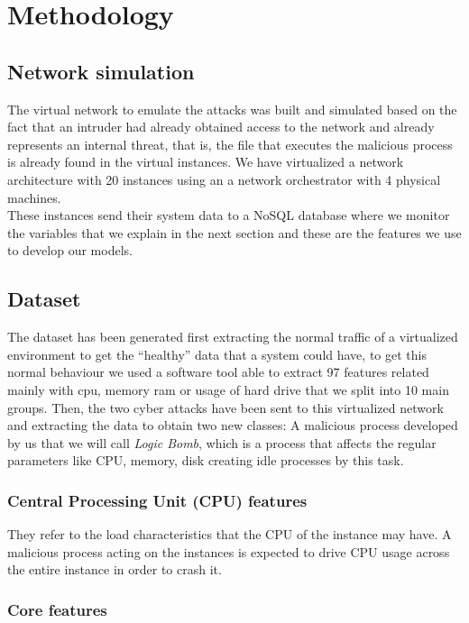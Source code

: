 \documentclass{iosart2c}
\begin{document}
\section{Methodology}

\subsection{Network simulation}

The virtual network to emulate the attacks was built and simulated based on the fact that an intruder had already obtained access to the network and already represents an internal threat, that is, the file that executes the malicious process is already found in the virtual instances. We have virtualized a network architecture with 20 instances using an a network orchestrator with 4 physical machines.\\

These instances send their system data to a NoSQL database where we monitor the variables that we explain in the next section and these are the features we use to develop our models.

\subsection{Dataset}\label{dataset_autoencoder}

The dataset has been generated first extracting the normal traffic of a virtualized environment to get the ``healthy'' data that a system could have, to get this normal behaviour we used a software tool able to extract 97 features related mainly with cpu, memory ram or usage of hard drive that we split into 10 main groups. Then, the two cyber attacks have been sent to this virtualized network and extracting the data to obtain two new classes: A malicious process developed by us that we will call \textit{Logic Bomb}, which is a process that affects the regular parameters like CPU, memory, disk creating idle processes by this task.

\subsubsection{Central Processing Unit (CPU) features}
They refer to the load characteristics that the CPU of the instance may have. A malicious process acting on the instances is expected to drive CPU usage across the entire instance in order to crash it.\\


\subsubsection{Core features}
\end{document}
